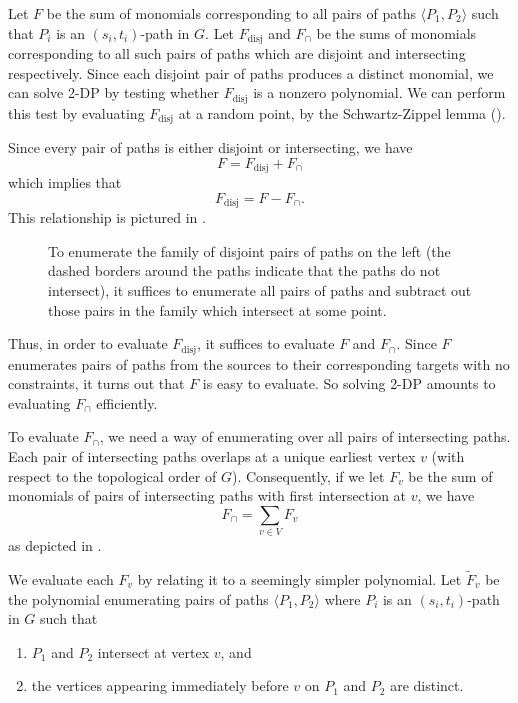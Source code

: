 \documentclass[11pt]{article}
\newcommand{\pair}[1]{\langle #1\rangle}
\DeclareMathOperator{\disj}{disj}
\theoremstyle{definition}
\begin{document}
Let $F$ be the sum of monomials corresponding to all pairs of paths $\pair{P_1,P_2}$ such that $P_i$ is an $(s_i,t_i)$-path in $G$.
Let $F_{\disj}$ and $F_{\cap}$ be the sums of monomials corresponding to all such pairs of paths which are disjoint and intersecting respectively.
Since each disjoint pair of paths produces a distinct monomial, we can solve \textsf{2-DP} by testing whether $F_{\disj}$ is a nonzero polynomial. 
We can perform this test by evaluating $F_{\disj}$ at a random point, by the Schwartz-Zippel lemma ().





Since every pair of paths is either disjoint or intersecting, we have 
    \[F = F_{\disj} + F_{\cap}\]
which implies that 
    \[F_{\disj} = F - F_{\cap}.\]
This relationship is pictured in .

\begin{figure}[t]
    \centering
    
    \caption{To enumerate the family of disjoint pairs of paths on the left (the dashed borders around the paths indicate that the paths do not intersect), it suffices to enumerate all pairs of paths and subtract out those pairs in the family which intersect at some point.}
    \label{fig:disj-to-intersect}
\end{figure}

Thus, in order to evaluate $F_{\disj}$, it suffices to evaluate $F$ and $F_{\cap}$.
Since $F$ enumerates  pairs of paths from the sources to their corresponding targets with no constraints, it turns out that $F$ is easy to evaluate.
So solving \textsf{2-DP} amounts to evaluating $F_{\cap}$ efficiently.


To evaluate $F_{\cap}$, we need a way of enumerating over all pairs of intersecting paths. 
Each pair of intersecting paths overlaps at a unique earliest vertex $v$ (with respect to the topological order of $G$).
Consequently, if we let $F_v$ be the sum of monomials of pairs of intersecting paths with first intersection at $v$, we have 
    \begin{equation}
    \label{overview-disj}
    F_{\cap} = \sum_{v\in V} F_v
    \end{equation}
as depicted in .

We evaluate each $F_v$ by relating it to a seemingly simpler polynomial.
Let $\tilde{F}_v$ be the polynomial enumerating pairs of paths $\pair{P_1,P_2}$ where $P_i$ is an $(s_i,t_i)$-path in $G$ such that
\begin{enumerate}
    \item $P_1$ and $P_2$ intersect at vertex $v$, and 
    \item the vertices appearing immediately before $v$ on $P_1$ and $P_2$ are distinct.
\end{enumerate}
\end{document}
